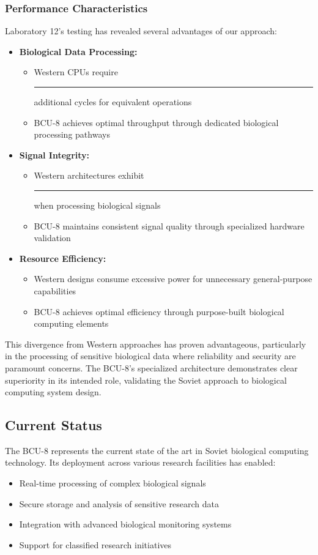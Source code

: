 \documentclass[12pt]{article}
\begin{document}
\subsubsection{Performance Characteristics}
Laboratory 12's testing has revealed several advantages of our approach:
\begin{itemize}
    \item \textbf{Biological Data Processing:}
        \begin{itemize}
            \item Western CPUs require \rule{45mm}{3.5mm} additional cycles for equivalent operations
            \item BCU-8 achieves optimal throughput through dedicated biological processing pathways
        \end{itemize}
    \item \textbf{Signal Integrity:}
        \begin{itemize}
            \item Western architectures exhibit \rule{50mm}{3.5mm} when processing biological signals
            \item BCU-8 maintains consistent signal quality through specialized hardware validation
        \end{itemize}
    \item \textbf{Resource Efficiency:}
        \begin{itemize}
            \item Western designs consume excessive power for unnecessary general-purpose capabilities
            \item BCU-8 achieves optimal efficiency through purpose-built biological computing elements
        \end{itemize}
\end{itemize}

This divergence from Western approaches has proven advantageous, particularly in the processing of sensitive biological data where reliability and security are paramount concerns. The BCU-8's specialized architecture demonstrates clear superiority in its intended role, validating the Soviet approach to biological computing system design.

\subsection{Current Status}
The BCU-8 represents the current state of the art in Soviet biological computing technology. Its deployment across various research facilities has enabled:
\begin{itemize}
    \item Real-time processing of complex biological signals
    \item Secure storage and analysis of sensitive research data
    \item Integration with advanced biological monitoring systems
    \item Support for classified research initiatives
\end{itemize}
\end{document}
